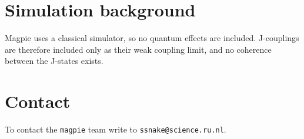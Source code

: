 \documentclass[11pt,a4paper]{article}
\begin{document}
\section{Simulation background}
Magpie uses a classical simulator, so no quantum effects are included. J-couplings are therefore included only as their weak coupling limit, and no coherence between the J-states exists.


\section{Contact}
To contact the \texttt{magpie} team write to \texttt{ssnake@science.ru.nl}.



\end{document}
